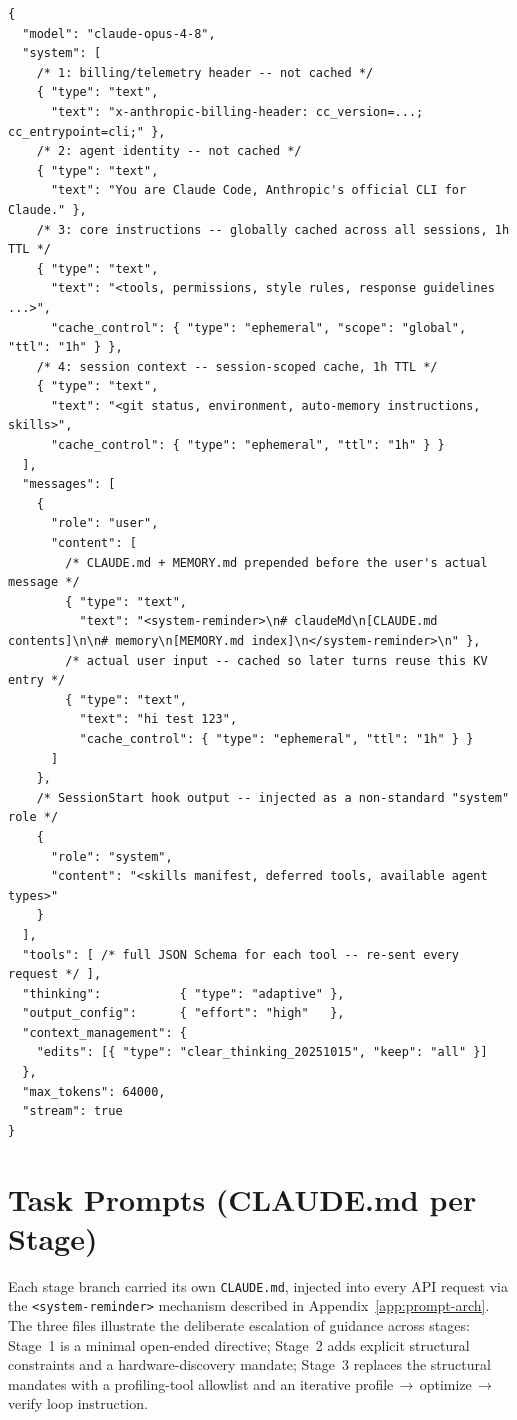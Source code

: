\documentclass[conference]{IEEEtran}
\begin{document}
\begin{lstlisting}
{
  "model": "claude-opus-4-8",
  "system": [
    /* 1: billing/telemetry header -- not cached */
    { "type": "text",
      "text": "x-anthropic-billing-header: cc_version=...; cc_entrypoint=cli;" },
    /* 2: agent identity -- not cached */
    { "type": "text",
      "text": "You are Claude Code, Anthropic's official CLI for Claude." },
    /* 3: core instructions -- globally cached across all sessions, 1h TTL */
    { "type": "text",
      "text": "<tools, permissions, style rules, response guidelines ...>",
      "cache_control": { "type": "ephemeral", "scope": "global", "ttl": "1h" } },
    /* 4: session context -- session-scoped cache, 1h TTL */
    { "type": "text",
      "text": "<git status, environment, auto-memory instructions, skills>",
      "cache_control": { "type": "ephemeral", "ttl": "1h" } }
  ],
  "messages": [
    {
      "role": "user",
      "content": [
        /* CLAUDE.md + MEMORY.md prepended before the user's actual message */
        { "type": "text",
          "text": "<system-reminder>\n# claudeMd\n[CLAUDE.md contents]\n\n# memory\n[MEMORY.md index]\n</system-reminder>\n" },
        /* actual user input -- cached so later turns reuse this KV entry */
        { "type": "text",
          "text": "hi test 123",
          "cache_control": { "type": "ephemeral", "ttl": "1h" } }
      ]
    },
    /* SessionStart hook output -- injected as a non-standard "system" role */
    {
      "role": "system",
      "content": "<skills manifest, deferred tools, available agent types>"
    }
  ],
  "tools": [ /* full JSON Schema for each tool -- re-sent every request */ ],
  "thinking":           { "type": "adaptive" },
  "output_config":      { "effort": "high"   },
  "context_management": {
    "edits": [{ "type": "clear_thinking_20251015", "keep": "all" }]
  },
  "max_tokens": 64000,
  "stream": true
}
\end{lstlisting}

\section{Task Prompts (CLAUDE.md per Stage)}

Each stage branch carried its own \texttt{CLAUDE.md}, injected into every API
request via the \texttt{<system-reminder>} mechanism described in
Appendix~\ref{app:prompt-arch}.
The three files illustrate the deliberate escalation of guidance across stages:
Stage~1 is a minimal open-ended directive; Stage~2 adds explicit structural
constraints and a hardware-discovery mandate; Stage~3 replaces the structural
mandates with a profiling-tool allowlist and an iterative
profile\,$\to$\,optimize\,$\to$\,verify loop instruction.
\end{document}
